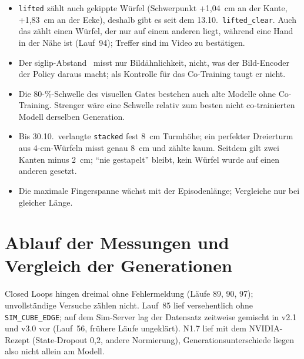 \begin{itemize}
  \item \texttt{lifted} zählt auch gekippte Würfel (Schwerpunkt +1,04~cm an der Kante,
    +1,83~cm an der Ecke), deshalb gibt es seit dem 13.10.\ \texttt{lifted\_clear}. Auch das
    zählt einen Würfel, der nur auf einem anderen liegt, während eine Hand in der Nähe ist
    (Lauf~94); Treffer sind im Video zu bestätigen.
  \item Der \acs{siglip}-Abstand~\cite{zhai2023siglip} misst nur Bildähnlichkeit, nicht, was der
    Bild-Encoder der Policy daraus macht; als Kontrolle für das Co-Training taugt er nicht.
  \item Die 80-\%-Schwelle des visuellen Gates bestehen auch alte Modelle ohne Co-Training.
    Strenger wäre eine Schwelle relativ zum besten nicht co-trainierten Modell derselben
    Generation.
  \item Bis 30.10.\ verlangte \texttt{stacked} fest 8~cm Turmhöhe; ein perfekter Dreierturm aus
    4-cm-Würfeln misst genau 8~cm und zählte kaum. Seitdem gilt zwei Kanten minus 2~cm;
    \enquote{nie gestapelt} bleibt, kein Würfel wurde auf einen anderen gesetzt.
  \item Die maximale Fingerspanne wächst mit der Episodenlänge; Vergleiche nur bei gleicher
    Länge.
\end{itemize}

\section{Ablauf der Messungen und Vergleich der Generationen}
\label{sec:grenzen-ablauf}
\label{sec:grenzen-generationen}

Closed Loops hingen dreimal ohne Fehlermeldung (Läufe 89, 90, 97); unvollständige Versuche
zählen nicht. Lauf~85 lief versehentlich ohne \texttt{SIM\_CUBE\_EDGE}; auf dem Sim-Server lag der
Datensatz zeitweise gemischt in v2.1 und v3.0 vor (Lauf~56, frühere Läufe ungeklärt). N1.7 lief
mit dem NVIDIA-Rezept (State-Dropout 0,2, andere Normierung), Generationsunterschiede liegen also
nicht allein am Modell.
